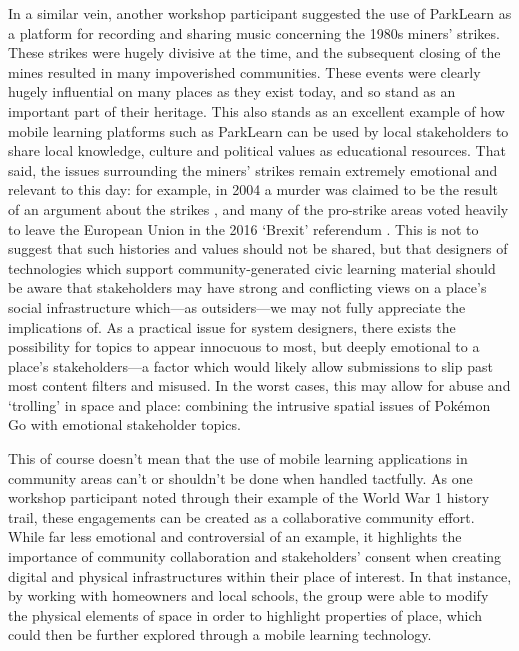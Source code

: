 In a similar vein, another workshop participant suggested the use of ParkLearn as a platform for recording and sharing music concerning the 1980s miners' strikes. These strikes were hugely divisive at the time, and the subsequent closing of the mines resulted in many impoverished communities. These events were clearly hugely influential on many places as they exist today, and so stand as an important part of their heritage. This also stands as an excellent example of how mobile learning platforms such as ParkLearn can be used by local stakeholders to share local knowledge, culture and political values as educational resources. That said, the issues surrounding the miners' strikes remain extremely emotional and relevant to this day: for example, in 2004 a murder was claimed to be the result of an argument about the strikes \citep{theindependent_2004}, and many of the pro-strike areas voted heavily to leave the European Union in the 2016 `Brexit' referendum \citep{dailypost_2017}. This is not to suggest that such histories and values should not be shared, but that designers of technologies which support community-generated civic learning material should be aware that stakeholders may have strong and conflicting views on a place's social infrastructure which---as outsiders---we may not fully appreciate the implications of. As a practical issue for system designers, there exists the possibility for topics to appear innocuous to most, but deeply emotional to a place's stakeholders---a factor which would likely allow submissions to slip past most content filters and misused. In the worst cases, this may allow for abuse and `trolling' in space and place: combining the intrusive spatial issues of Pok\'emon Go with emotional stakeholder topics.

This of course doesn't mean that the use of mobile learning applications in community areas can't or shouldn't be done when handled tactfully. As one workshop participant noted through their example of the World War 1 history trail, these engagements can be created as a collaborative community effort. While far less emotional and controversial of an example, it highlights the importance of community collaboration and stakeholders' consent when creating digital and physical infrastructures within their place of interest. In that instance, by working with homeowners and local schools, the group were able to modify the physical elements of space in order to highlight properties of place, which could then be further explored through a mobile learning technology. 

